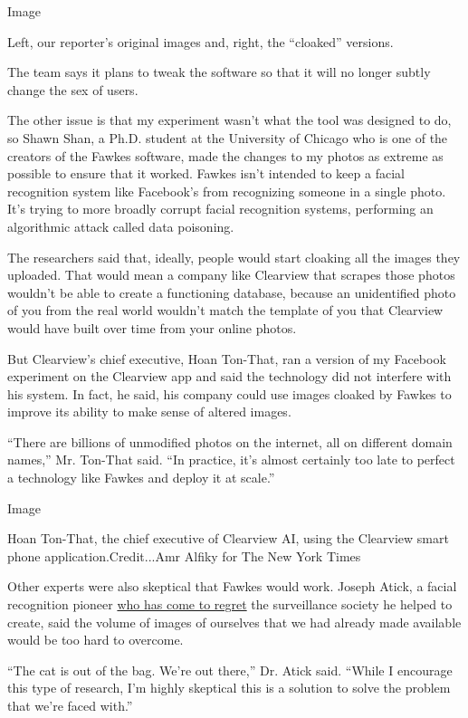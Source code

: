 Image

Left, our reporter's original images and, right, the ``cloaked''
versions.

The team says it plans to tweak the software so that it will no longer
subtly change the sex of users.

The other issue is that my experiment wasn't what the tool was designed
to do, so Shawn Shan, a Ph.D. student at the University of Chicago who
is one of the creators of the Fawkes software, made the changes to my
photos as extreme as possible to ensure that it worked. Fawkes isn't
intended to keep a facial recognition system like Facebook's from
recognizing someone in a single photo. It's trying to more broadly
corrupt facial recognition systems, performing an algorithmic attack
called data poisoning.

The researchers said that, ideally, people would start cloaking all the
images they uploaded. That would mean a company like Clearview that
scrapes those photos wouldn't be able to create a functioning database,
because an unidentified photo of you from the real world wouldn't match
the template of you that Clearview would have built over time from your
online photos.

But Clearview's chief executive, Hoan Ton-That, ran a version of my
Facebook experiment on the Clearview app and said the technology did not
interfere with his system. In fact, he said, his company could use
images cloaked by Fawkes to improve its ability to make sense of altered
images.

``There are billions of unmodified photos on the internet, all on
different domain names,'' Mr. Ton-That said. ``In practice, it's almost
certainly too late to perfect a technology like Fawkes and deploy it at
scale.''

Image

Hoan Ton-That, the chief executive of Clearview AI, using the Clearview
smart phone application.Credit...Amr Alfiky for The New York Times

Other experts were also skeptical that Fawkes would work. Joseph Atick,
a facial recognition pioneer
\href{https://www.nytimes3xbfgragh.onion/2014/05/18/technology/never-forgetting-a-face.html}{who
has come to regret} the surveillance society he helped to create, said
the volume of images of ourselves that we had already made available
would be too hard to overcome.

``The cat is out of the bag. We're out there,'' Dr. Atick said. ``While
I encourage this type of research, I'm highly skeptical this is a
solution to solve the problem that we're faced with.''

